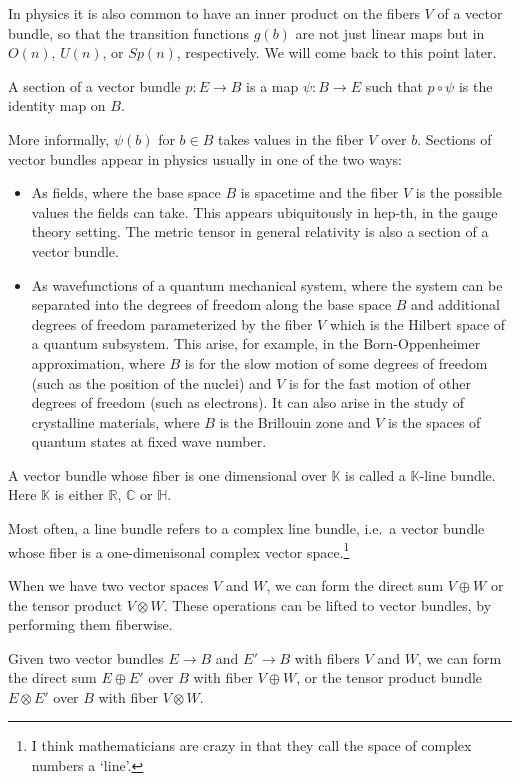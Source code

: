 \documentclass[12pt]{article}
\numberwithin{equation}{section}
\theoremstyle{remark}
\def\bC{\mathbb{C}}
\def\bH{\mathbb{H}}
\def\bK{\mathbb{K}}
\def\bR{\mathbb{R}}
\begin{document}
In physics it is also common to have an inner product on the fibers $V$ of a vector bundle,
so that the transition functions $g (b)$ are not just linear maps
but in $O(n)$, $U(n)$, or $Sp(n)$, respectively.
We will come back to this point later.


\begin{definition}
  A section of a vector bundle $p:E\to B$ is a map $\psi: B\to E$ such that $p\circ \psi $ is the identity map on $B$.
\end{definition}
More informally, $\psi(b)$ for $b\in B$ takes values in the fiber $V$ over $b$.
Sections of vector bundles appear in physics usually in one of the two ways:
\begin{itemize}
  \item As fields, where the base space $B$ is spacetime and 
  the fiber $V$ is the possible values the fields can take.
  This appears ubiquitously in hep-th, in the gauge theory setting.
  The metric tensor in general relativity is also a section of a vector bundle.
  \item As wavefunctions of a quantum mechanical system, 
  where the system can be separated 
  into the degrees of freedom along the base space $B$
  and additional degrees of freedom parameterized by the fiber $V$ 
  which is the Hilbert space of a quantum subsystem.
  This arise, for example, in the Born-Oppenheimer approximation,
  where $B$ is for the slow motion of some degrees of freedom (such as the position of the nuclei) and 
  $V$ is for the fast motion of other degrees of freedom (such as electrons).
  It can also arise in the study of crystalline materials,
  where $B$ is the Brillouin zone and $V$ is the spaces of quantum states at fixed wave number.
\end{itemize}

\begin{definition}
A vector bundle whose fiber is one dimensional over $\bK$ is called a 
$\bK$-line bundle.
Here $\bK$ is either $\bR$, $\bC$ or $\bH$.
\end{definition}
Most often, a line bundle refers to a complex line bundle, i.e.~a vector bundle
whose fiber is a one-dimenisonal complex vector space.\footnote{%
I think mathematicians are crazy in that they call the space of complex numbers a `line'.
}

When we have two vector spaces $V$ and $W$,
we can form the direct sum $V\oplus W$ or the tensor product $V\otimes W$.
These operations can be lifted to vector bundles,
by performing them fiberwise.
\begin{definition}
  Given two vector bundles $E\to B$ and $E'\to B$ with fibers $V$ and $W$,
  we can form the direct sum $E\oplus E'$ over $B$ with fiber $V\oplus W$,
  or the tensor product bundle $E\otimes E'$ over $B$ with fiber $V\otimes W$.  
\end{definition}
\end{document}
